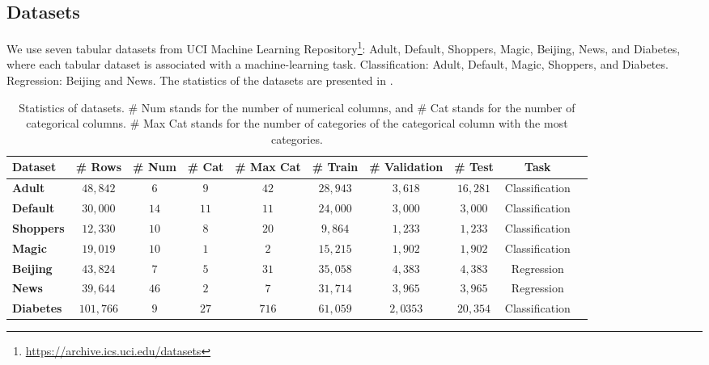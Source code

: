 \subsection{Datasets}\label{appendix:datasets}
We use seven tabular datasets from UCI Machine Learning Repository\footnote{\url{https://archive.ics.uci.edu/datasets}}: Adult, Default, Shoppers, Magic, Beijing, News, and Diabetes, where each tabular dataset is associated with a machine-learning task. Classification: Adult, Default, Magic, Shoppers, and Diabetes. Regression: Beijing and News. The statistics of the datasets are presented in . 
\begin{table}[h] 
    \centering
    \caption{Statistics of datasets. \# Num stands for the number of numerical columns, and \# Cat stands for the number of categorical columns. \# Max Cat stands for the number of categories of the categorical column with the most categories.} 
    \label{tbl:exp-dataset}
    \small
    \begin{threeparttable}
    {
    \scalebox{1.0}
    {
	\begin{tabular}{Gccccccccc}
            \toprule[0.8pt]
            \textbf{Dataset} & \# Rows  & \# Num & \# Cat & \# Max Cat & \# Train & \# Validation & \# Test & Task  \\
            \midrule 
            \textbf{Adult} & $48,842$ & $6$ & $9$ & $42$ & $28,943$ & $3,618$ & $16,281$ & Classification  \\
            \textbf{Default} & $30,000$ & $14$ & $11$ & $11$ & $24,000$ & $3,000$ & $3,000$ & Classification   \\
            \textbf{Shoppers} & $12,330$ & $10$ & $8$ & $20$ & $9,864$   & $1,233$ & $1,233$ & Classification   \\
            \textbf{Magic} & $19,019$ & $10$ & $1$ & $2$ & $15,215$  & $1,902$ & $1,902$ & Classification  \\
            \textbf{Beijing} & $43,824$ & $7$ & $5$ & $31$ & $35,058$  & $4,383$ & $4,383$ &  Regression   \\
            \textbf{News} & $39,644$ & $46$ & $2$ & $7$ & $31,714$  & $3,965$ & $3,965$ & Regression \\
            \textbf{Diabetes} & $101,766$ & $9$ & $27$ & $716$ & $61,059$  & $2,0353$ & $20,354$ & Classification  \\
		\bottomrule[1.0pt] 
		\end{tabular}
   }
  }        
  \end{threeparttable}
\end{table}

